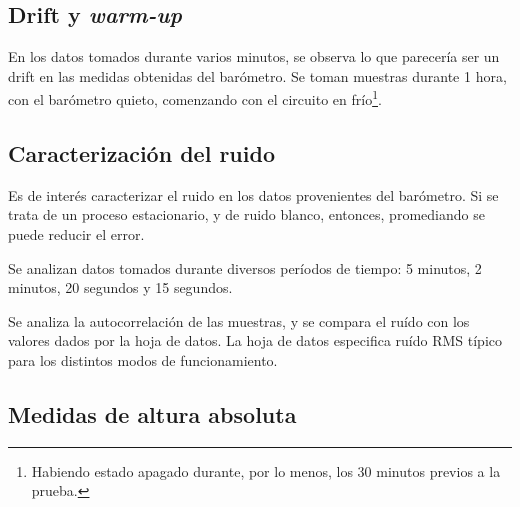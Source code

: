 \documentclass[spanish,12pt,a4paper,titlepage]{report}
\begin{document}
\subsection{Drift y \textit{warm-up}}
\label{sec:drift-y-warm-up}

En los datos tomados durante varios minutos, se observa lo que parecería ser un drift en las medidas obtenidas del barómetro. Se toman muestras durante 1 hora, con el barómetro quieto, comenzando con el circuito en frío\footnote{Habiendo estado apagado durante, por lo menos, los 30 minutos previos a la prueba.}.

\subsection{Caracterización del ruido}

Es de interés caracterizar el ruido en los datos provenientes del barómetro. Si se trata de un proceso estacionario, y de ruido blanco, entonces, promediando se puede reducir el error.

Se analizan datos tomados durante diversos períodos de tiempo: 5 minutos, 2 minutos, 20 segundos y 15 segundos.

Se analiza la autocorrelación de las muestras, y se compara el ruído con los valores dados por la hoja de datos. La hoja de datos especifica ruído RMS típico para los distintos modos de funcionamiento.

\subsection{Medidas de altura absoluta}
\end{document}
